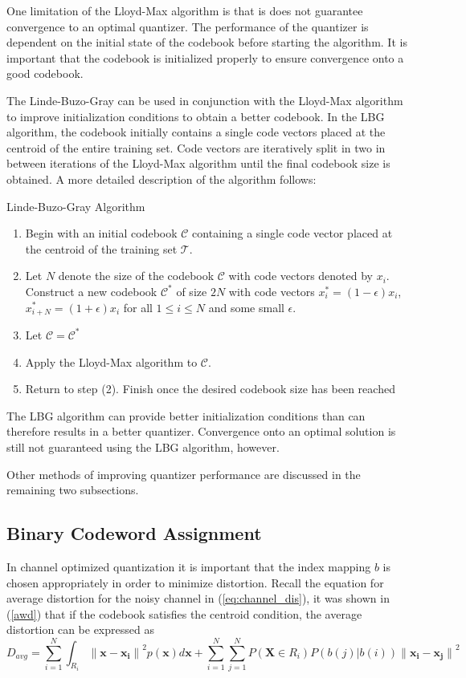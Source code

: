 \documentclass[10pt]{article}
\begin{document}
One limitation of the Lloyd-Max algorithm is that is does not guarantee convergence to an optimal quantizer. The performance of the quantizer is dependent on the initial state of the codebook before starting the algorithm. It is important that the codebook is initialized properly to ensure convergence onto a good codebook.

The Linde-Buzo-Gray can be used in conjunction with the Lloyd-Max algorithm to improve initialization conditions to obtain a better codebook. In the LBG algorithm, the codebook initially contains a single code vectors placed at the centroid of the entire training set. Code vectors are iteratively split in two in between iterations of the Lloyd-Max algorithm until the final codebook size is obtained. A more detailed description of the algorithm follows:

\medskip

{\sc \noindent Linde-Buzo-Gray Algorithm}
\begin{enumerate}
\item Begin with an initial codebook $\mathcal{C}$ containing a single code vector placed at the centroid of the training set $\mathcal{T}$.
\item Let $N$ denote the size of the codebook $\mathcal{C}$ with code vectors denoted by $x_i$. Construct a new codebook $\mathcal{C}^*$ of size $2N$ with code vectors $x_i^* = (1-\epsilon)x_i$, $x_{i+N}^* = (1+\epsilon)x_i$ for all $1 \le i \le N$ and some small $\epsilon$.
\item Let $\mathcal{C}=\mathcal{C}^*$
\item Apply the Lloyd-Max algorithm to $\mathcal{C}$.
\item Return to step (2). Finish once the desired codebook size has been reached
\end{enumerate}

The LBG algorithm can provide better initialization conditions than can therefore results in a better quantizer. Convergence onto an optimal solution is still not guaranteed using the LBG algorithm, however.

Other methods of improving quantizer performance are discussed in the remaining two subsections.

\subsection{Binary Codeword Assignment}
\label{sec:code_assign}
In channel optimized quantization it is important that the index mapping $b$ is chosen appropriately in order to minimize distortion. Recall the equation for average distortion for the noisy channel in (\ref{eq:channel_dis}), it was shown in (\ref{awd}) that if the codebook satisfies the centroid condition, the average distortion can be expressed as
\begin{equation}
\label{eq:codeword_distortion}
D_{avg}  = \sum_{i=1}^N \int_{R_i} {\|\mathbf{x} - \mathbf{x_i}\|}^2p(\mathbf{x})d\mathbf{x} + \sum_{i=1}^N \sum_{j=1}^N P(\mathbf{X} \in R_i) P(b(j)|b(i)) {\|\mathbf{x_i} - \mathbf{x_j}\|}^2
\end{equation}
\end{document}
